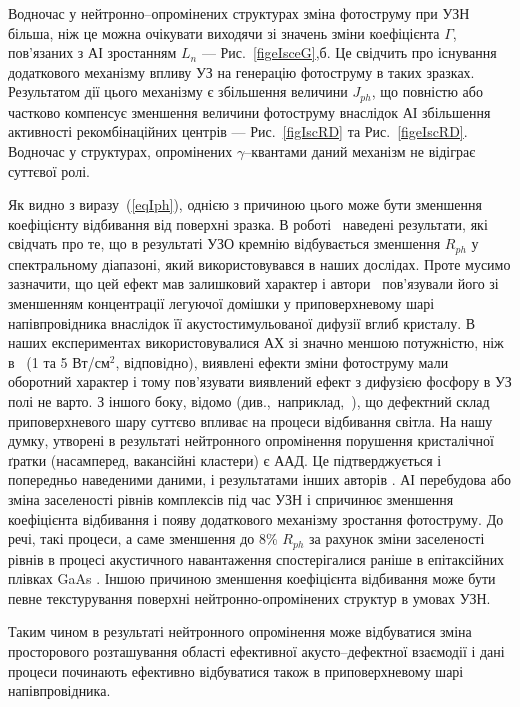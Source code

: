 Водночас у нейтронно--опромінених структурах зміна фотоструму при УЗН більша,
ніж це можна очікувати виходячи зі значень зміни коефіцієнта $\Gamma$, пов’язаних з АІ зростанням $L_n$ --- Рис.~\ref{figeIsceG},б.
Це свідчить про існування додаткового механізму впливу УЗ на генерацію фотоструму в таких зразках.
Результатом дії цього механізму є збільшення величини $J_{ph}$, що повністю або частково компенсує
зменшення величини фотоструму внаслідок АІ збільшення активності рекомбінаційних центрів --- Рис.~\ref{figIscRD} та Рис.~\ref{figeIscRD}.
Водночас у структурах, опромінених $\gamma$--квантами даний механізм не відіграє суттєвої ролі.


Як видно з виразу~(\ref{eqIph}), однією з причиною цього може бути зменшення коефіцієнту відбивання від поверхні зразка.
В роботі~\cite{Zaver} наведені результати, які свідчать про те, що в результаті УЗО кремнію відбувається
зменшення $R_{ph}$ у спектральному
діапазоні, який використовувався в наших дослідах.
Проте мусимо зазначити, що цей ефект мав залишковий характер і
автори~\cite{Zaver} пов’язували його зі зменшенням концентрації
легуючої домішки у приповерхневому шарі напівпровідника внаслідок
її акустостимульованої дифузії вглиб кристалу.
В наших експериментах використовувалися АХ зі значно меншою потужністю, ніж
в~\cite{Zaver} (1 та 5 Вт/см$^2$, відповідно),  виявлені ефекти зміни фотоструму мали оборотний характер
і тому пов'язувати виявлений ефект з дифузією фосфору в УЗ полі не варто.
З іншого боку, відомо (див.,~наприклад,~\cite{Kizel}), що дефектний склад
приповерхневого шару суттєво впливає на процеси відбивання світла.
На нашу думку, утворені в результаті нейтронного опромінення порушення кристалічної ґратки
(насамперед, вакансійні кластери) є ААД.
Це підтверджується і попередньо наведеними даними, і результатами інших авторів \cite{YOlikh2006TPLr}.
АІ перебудова або зміна заселеності рівнів комплексів під час УЗН і спричинює зменшення коефіцієнта відбивання
і появу додаткового механізму зростання фотоструму.
До речі, такі процеси, а саме зменшення до 8\% $R_{ph}$ за рахунок зміни заселеності рівнів в
процесі акустичного навантаження спостерігалися раніше в
епітаксійних плівках GaAs \cite{Korotch}.
Іншою причиною зменшення
коефіцієнта відбивання може бути певне текстурування поверхні нейтронно-опромінених
структур в умовах УЗН.

Таким чином в результаті нейтронного опромінення може відбуватися
зміна просторового розташування області ефективної акусто--дефектної
взаємодії і дані процеси починають ефективно відбуватися також в
приповерхневому шарі напівпровідника.




